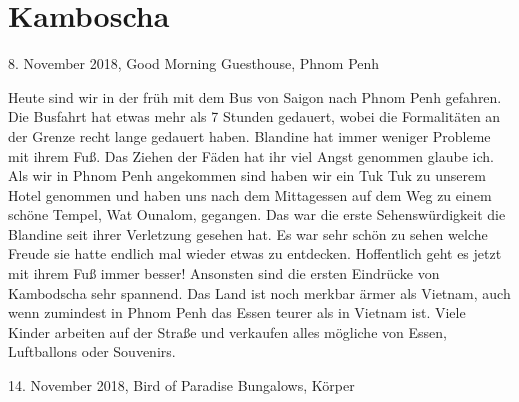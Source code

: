 \documentclass[11pt]{book}
\begin{document}
\chapter{Kamboscha}

8. November 2018, Good Morning Guesthouse, Phnom Penh

Heute sind wir in der früh mit dem Bus von Saigon nach Phnom Penh gefahren. Die Busfahrt hat etwas mehr als 7 Stunden gedauert, 
wobei die Formalitäten an der Grenze recht lange gedauert haben. Blandine hat immer weniger Probleme mit ihrem Fuß. Das Ziehen der 
Fäden hat ihr viel Angst genommen glaube ich. Als wir in Phnom Penh angekommen sind haben wir ein Tuk Tuk zu unserem Hotel genommen 
und haben uns nach dem Mittagessen auf dem Weg zu einem schöne Tempel, Wat Ounalom, gegangen. Das war die erste Sehenswürdigkeit 
die Blandine seit ihrer Verletzung gesehen hat. Es war sehr schön zu sehen welche Freude sie hatte endlich mal wieder etwas zu entdecken.
Hoffentlich geht es jetzt mit ihrem Fuß immer besser! Ansonsten sind die ersten Eindrücke von Kambodscha sehr spannend. Das Land 
ist noch merkbar ärmer als Vietnam, auch wenn zumindest in Phnom Penh das Essen teurer als in Vietnam ist. Viele Kinder arbeiten 
auf der Straße und verkaufen alles mögliche von Essen, Luftballons oder Souvenirs.  


14. November 2018, Bird of Paradise Bungalows, Körper
\end{document}

